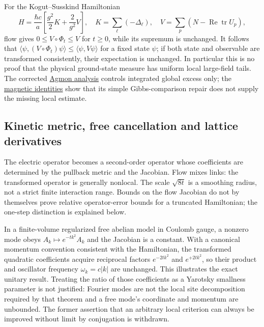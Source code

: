\documentclass[11pt,a4paper]{article}
\begin{document}
For the Kogut--Susskind Hamiltonian
\[H=\frac{\hbar c}{a}\left[\frac{g^2}{2}K+\frac2{g^2}V\right],\quad
K=\sum_\ell(-\Delta_\ell),\quad
V=\sum_p(N-\operatorname{Re}\operatorname{tr}U_p),\] flow gives
\(0\le V\circ\Phi_t\le V\) for \(t\ge0\), while its supremum is
unchanged. It follows that
\(\langle\psi,(V\circ\Phi_t)\psi\rangle\le\langle\psi,V\psi\rangle\) for
a fixed state \(\psi\); if both state and observable are transformed
consistently, their expectation is unchanged. In particular this is no
proof that the physical ground-state measure has uniform local
large-field tails. The corrected
\href{ground-state-measure-transfer.md\#weighted-estimates-and-global-magnetic-tails}{Agmon
analysis} controls integrated global excess only; the
\href{ground-state-measure-transfer.md\#common-setting-and-magnetic-identities}{magnetic
identities} show that its simple Gibbs-comparison repair does not supply
the missing local estimate.

\hypertarget{kinetic-metric-free-cancellation-and-lattice-derivatives}{%
\subsection{Kinetic metric, free cancellation and lattice
derivatives}\label{kinetic-metric-free-cancellation-and-lattice-derivatives}}

The electric operator becomes a second-order operator whose coefficients
are determined by the pullback metric and the Jacobian. Flow mixes
links: the transformed operator is generally nonlocal. The scale
\(\sqrt{8t}\) is a smoothing radius, not a strict finite interaction
range. Bounds on the flow Jacobian do not by themselves prove relative
operator-error bounds for a truncated Hamiltonian; the one-step
distinction is explained below.

In a finite-volume regularized free abelian model in Coulomb gauge, a
nonzero mode obeys \(A_k\mapsto e^{-tk^2}A_k\) and the Jacobian is a
constant. With a canonical momentum convention consistent with the
Hamiltonian, the transformed quadratic coefficients acquire reciprocal
factors \(e^{-2tk^2}\) and \(e^{+2tk^2}\), so their product and
oscillator frequency \(\omega_k=c|k|\) are unchanged. This illustrates
the exact unitary result. Treating the ratio of those coefficients as a
Yarotsky smallness parameter is not justified: Fourier modes are not the
local site decomposition required by that theorem and a free mode's
coordinate and momentum are unbounded. The former assertion that an
arbitrary local criterion can always be improved without limit by
conjugation is withdrawn.
\end{document}
